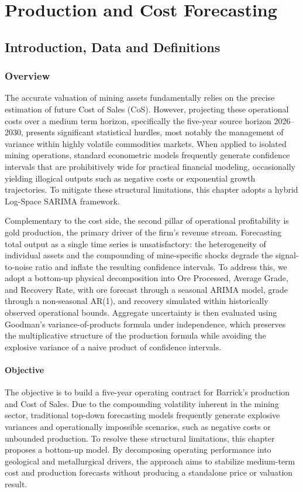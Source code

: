 \chapter{Production and Cost Forecasting}
\label{ch:operations}
\section{Introduction, Data and Definitions}
\subsection{Overview}
The accurate valuation of mining assets fundamentally relies on the precise estimation of future Cost of Sales (CoS). However, projecting these operational costs over a medium term horizon, specifically the five-year source horizon 2026--2030, presents significant statistical hurdles, most notably the management of variance within highly volatile commodities markets. When applied to isolated mining operations, standard econometric models frequently generate confidence intervals that are prohibitively wide for practical financial modeling, occasionally yielding illogical outputs such as negative costs or exponential growth trajectories. To mitigate these structural limitations, this chapter adopts a hybrid Log-Space SARIMA framework.

Complementary to the cost side, the second pillar of operational profitability is gold production, the primary driver of the firm's revenue stream. Forecasting total output as a single time series is unsatisfactory: the heterogeneity of individual assets and the compounding of mine-specific shocks degrade the signal-to-noise ratio and inflate the resulting confidence intervals. To address this, we adopt a bottom-up physical decomposition into Ore Processed, Average Grade, and Recovery Rate, with ore forecast through a seasonal ARIMA model, grade through a non-seasonal AR(1), and recovery simulated within historically observed operational bounds. Aggregate uncertainty is then evaluated using Goodman's variance-of-products formula under independence, which preserves the multiplicative structure of the production formula while avoiding the explosive variance of a naive product of confidence intervals.

\subsubsection{Objective}
The objective is to build a five-year operating contract for Barrick's production and Cost of Sales. Due to the compounding volatility inherent in the mining sector, traditional top-down forecasting models frequently generate explosive variances and operationally impossible scenarios, such as negative costs or unbounded production. To resolve these structural limitations, this chapter proposes a bottom-up model. By decomposing operating performance into geological and metallurgical drivers, the approach aims to stabilize medium-term cost and production forecasts without producing a standalone price or valuation result.
